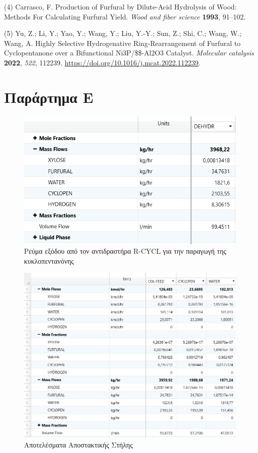 \documentclass[11pt]{article}
\begin{document}
\hypertarget{citeproc_bib_item_4}{(4) Carrasco, F. Production of Furfural by Dilute-Acid Hydrolysis of Wood: Methods For Calculating Furfural Yield. \textit{Wood and fiber science} \textbf{1993}, 91–102.}

\hypertarget{citeproc_bib_item_5}{(5) Yu, Z.; Li, Y.; Yao, Y.; Wang, Y.; Liu, Y.-Y.; Sun, Z.; Shi, C.; Wang, W.; Wang, A. Highly Selective Hydrogenative Ring-Rearrangement of Furfural to Cyclopentanone over a Bifunctional Ni3P/\$\gamma\$-Al2O3 Catalyst. \textit{Molecular catalysis} \textbf{2022}, \textit{522}, 112239. \url{https://doi.org/10.1016/j.mcat.2022.112239}.}

\section{Παράρτημα E}
\label{sec:org33d5669}
\begin{figure}[htbp]
\centering
\includegraphics[width=.9\linewidth]{Παράρτημα/2023-01-13_18-10-03_screenshot.png}
\caption{Ρεύμα εξόδου από τον αντιδραστήρα R-CYCL για την παραγωγή της κυκλοπεντανόνης}
\end{figure}

\begin{figure}[htbp]
\centering
\includegraphics[width=.9\linewidth]{Παράρτημα/2023-01-13_18-10-10_screenshot.png}
\caption{Αποτελέσματα Αποστακτικής Στήλης}
\end{figure}
\end{document}
